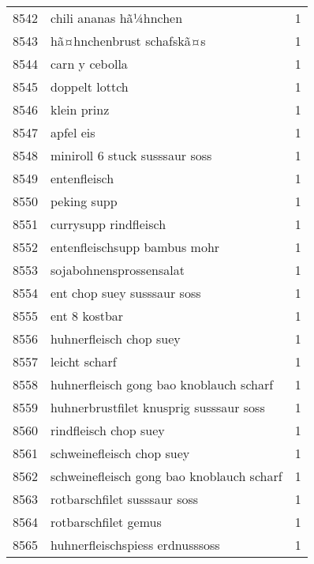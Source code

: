 \begin{tabular}{llr}
8542 &                             chili ananas hã¼hnchen &      1 \\
8543 &                          hã¤hnchenbrust schafskã¤s &      1 \\
8544 &                                     carn y cebolla &      1 \\
8545 &                                     doppelt lottch &      1 \\
8546 &                                        klein prinz &      1 \\
8547 &                                          apfel eis &      1 \\
8548 &                     miniroll 6 stuck susssaur soss &      1 \\
8549 &                                       entenfleisch &      1 \\
8550 &                                        peking supp &      1 \\
8551 &                              currysupp rindfleisch &      1 \\
8552 &                       entenfleischsupp bambus mohr &      1 \\
8553 &                            sojabohnensprossensalat &      1 \\
8554 &                        ent chop suey susssaur soss &      1 \\
8555 &                                      ent 8 kostbar &      1 \\
8556 &                            huhnerfleisch chop suey &      1 \\
8557 &                                      leicht scharf &      1 \\
8558 &            huhnerfleisch gong bao knoblauch scharf &      1 \\
8559 &            huhnerbrustfilet knusprig susssaur soss &      1 \\
8560 &                              rindfleisch chop suey &      1 \\
8561 &                          schweinefleisch chop suey &      1 \\
8562 &          schweinefleisch gong bao knoblauch scharf &      1 \\
8563 &                       rotbarschfilet susssaur soss &      1 \\
8564 &                               rotbarschfilet gemus &      1 \\
8565 &                    huhnerfleischspiess erdnusssoss &      1 \\

\end{tabular}
